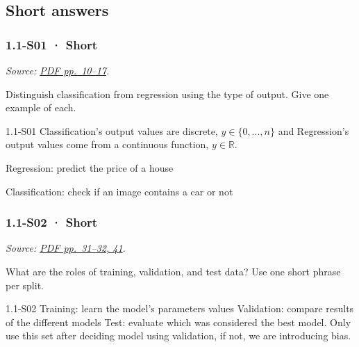 \subsection{Short answers}\label{short-answers}

\noindent\begin{minipage}{\linewidth}

\subsubsection{1.1-S01 · Short}\label{s01-short}

\emph{Source:
\href{../Lecture\%20Slides/1.1.\%20Fundamentals.pdf\#page=10}{PDF
pp.~10--17}.}

Distinguish classification from regression using the type of output.
Give one example of each.

\begin{solution}[20mm]{1.1-S01}
Classification's output values are discrete, $y\in\{0,...,n\}$ and Regression's output values come from a continuous function, $y\in\mathbb{R}$.

Regression: predict the price of a house

Classification: check if an image contains a car or not
\end{solution}
\end{minipage}\par\medskip

\noindent\begin{minipage}{\linewidth}

\subsubsection{1.1-S02 · Short}\label{s02-short}

\emph{Source:
\href{../Lecture\%20Slides/1.1.\%20Fundamentals.pdf\#page=31}{PDF
pp.~31--32, 41}.}

What are the roles of training, validation, and test data? Use one short
phrase per split.

\begin{solution}[20mm]{1.1-S02}
Training: learn the model's parameters values
Validation: compare results of the different models
Test: evaluate which was considered the best model. Only use this set after deciding model using validation, if not, we are introducing bias.
\end{solution}
\end{minipage}\par\medskip

